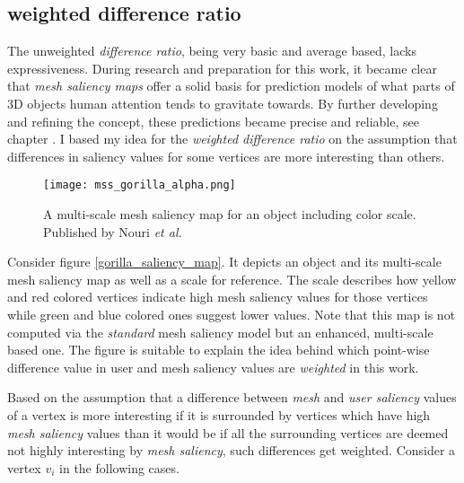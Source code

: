 		\subsection{weighted difference ratio}
		\label{sec:weighted_difference_ratio}
The unweighted \textit{difference ratio}, being very basic and average based, lacks expressiveness. During research and preparation for this work, it became clear that \textit{mesh saliency maps} offer a solid basis for prediction models of what parts of 3D objects human attention tends to gravitate towards. By further developing and refining the concept, these predictions became precise and reliable, see chapter \cite{sec:related_work}. I based my idea for the \textit{weighted difference ratio} on the assumption that differences in saliency values for some vertices are more interesting than others.

\begin{figure}[htb]
  \centering
  \texttt{[image: mss\_gorilla\_alpha.png]}\\ %
  \caption{A multi-scale mesh saliency map for an object including color scale. Published by Nouri \textit{et al.} \cite{nouri2015multi}}\label{fig:gorilla_saliency_map}
\end{figure}

Consider figure \ref{gorilla_saliency_map}. It depicts an object and its multi-scale mesh saliency map as well as a scale for reference. The scale describes how yellow and red colored vertices indicate high mesh saliency values for those vertices while green and blue colored ones suggest lower values. Note that this map is not computed via the \textit{standard} mesh saliency model but an enhanced, multi-scale based one. The figure is suitable to explain the idea behind which point-wise difference value in user and mesh saliency values are \textit{weighted} in this work.

Based on the assumption that a difference between \textit{mesh} and \textit{user saliency} values of a vertex is more interesting if it is surrounded by vertices which have high \textit{mesh saliency} values than it would be if all the surrounding vertices are deemed not highly interesting by \textit{mesh saliency}, such differences get weighted. Consider a vertex $v_i$ in the following cases.

